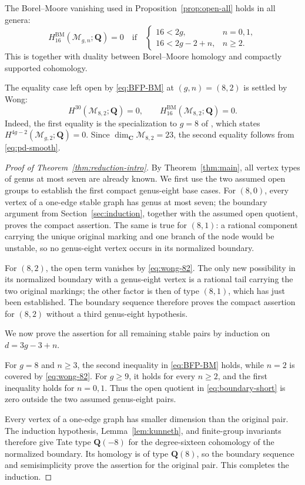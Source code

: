 \documentclass[12pt,reqno]{amsart}
\newcommand{\Q}{\mathbf{Q}}
\newcommand{\C}{\mathbf{C}}
\newcommand{\M}{\mathcal{M}}
\newcommand{\BM}{\mathrm{BM}}
\theoremstyle{definition}
\theoremstyle{remark}
\begin{document}
The Borel--Moore vanishing used in Proposition~\ref{prop:open-all} holds in
all genera:
\begin{equation}\label{eq:BFP-BM}
 H_{16}^{\BM}(\M_{g,n};\Q)=0
 \quad\text{if}\quad
 \begin{cases}
 16<2g,&n=0,1,\\
 16<2g-2+n,&n\geq2.
 \end{cases}
\end{equation}
This is \cite[Proposition~2.1]{BFP} together with duality between
Borel--Moore homology and compactly supported cohomology.

The equality case left open by \eqref{eq:BFP-BM} at $(g,n)=(8,2)$ is
settled by Wong:
\begin{equation}\label{eq:wong-82}
 H^{30}(\M_{8,2};\Q)=0,
 \qquad H_{16}^{\BM}(\M_{8,2};\Q)=0.
\end{equation}
Indeed, the first equality is the specialization to $g=8$ of
\cite[Theorem~4.1]{Wong}, which states
$H^{4g-2}(\M_{g,2};\Q)=0$.  Since
$\dim_{\C}\M_{8,2}=23$, the second equality follows from
\eqref{eq:pd-smooth}.

\begin{proof}[Proof of Theorem~\ref{thm:reduction-intro}]
By Theorem~\ref{thm:main}, all vertex types of genus at most seven are
already known.  We first use the two assumed open groups to establish the
first compact genus-eight base cases.  For $(8,0)$, every vertex of a one-edge
stable graph has genus at most seven; the boundary argument from
Section~\ref{sec:induction}, together with the assumed open quotient, proves
the compact assertion.  The same is true for $(8,1)$: a rational component
carrying the unique original marking and one branch of the node would be
unstable, so no genus-eight vertex occurs in its normalized boundary.

For $(8,2)$, the open term vanishes by \eqref{eq:wong-82}.  The only new
possibility in its normalized boundary with a genus-eight vertex is a
rational tail carrying the two original markings; the other factor is then
of type $(8,1)$, which has just been established.  The boundary sequence
therefore proves the compact assertion for $(8,2)$ without a third
genus-eight hypothesis.

We now prove the assertion for all remaining stable pairs by induction on
$d=3g-3+n$.

For $g=8$ and $n\geq3$, the second inequality in \eqref{eq:BFP-BM} holds,
while $n=2$ is covered by \eqref{eq:wong-82}.
For $g\geq9$, it holds for every $n\geq2$, and the first inequality holds
for $n=0,1$.  Thus the open quotient in \eqref{eq:boundary-short} is zero
outside the two assumed genus-eight pairs.

Every vertex of a one-edge graph has smaller dimension than the original
pair.  The induction hypothesis, Lemma~\ref{lem:kunneth}, and finite-group
invariants therefore give Tate type $\Q(-8)$ for the degree-sixteen
cohomology of the normalized boundary.  Its homology is of type $\Q(8)$,
so the boundary sequence and semisimplicity prove the assertion for the
original pair.  This completes the induction.
\end{proof}
\end{document}
